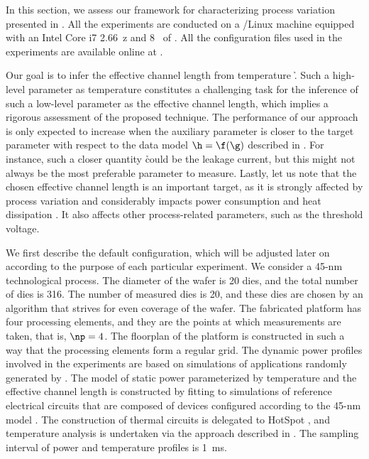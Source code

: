 In this section, we assess our framework for characterizing process variation
presented in . All the experiments are conducted on a
/Linux machine equipped with an Intel Core i7 2.66~z and
8~ of . All the configuration files used in the experiments are
available online at \cite{eslab2014a}.

Our goal is to infer the effective channel length \g from temperature \h. Such a
high-level parameter as temperature constitutes a challenging task for the
inference of such a low-level parameter as the effective channel length, which
implies a rigorous assessment of the proposed technique. The performance of our
approach is only expected to increase when the auxiliary parameter \h is closer
to the target parameter \g with respect to the data model $\h = \f(\g)$
described in . For instance, such a closer quantity \h
could be the leakage current, but this might not always be the most preferable
parameter to measure. Lastly, let us note that the chosen effective channel
length is an important target, as it is strongly affected by process variation
and considerably impacts power consumption and heat dissipation
\cite{chandrakasan2000, srivastava2010, juan2011, juan2012}. It also affects
other process-related parameters, such as the threshold voltage.

We first describe the default configuration, which will be adjusted later on
according to the purpose of each particular experiment. We consider a 45-nm
technological process. The diameter of the wafer is 20 dies, and the total
number of dies \nd is 316. The number of measured dies \hnd is 20, and these
dies are chosen by an algorithm that strives for even coverage of the wafer. The
fabricated platform has four processing elements, and they are the points at
which measurements are taken, that is, $\np = 4$. The floorplan of the platform
is constructed in such a way that the processing elements form a regular grid.
The dynamic power profiles involved in the experiments are based on simulations
of applications randomly generated by  \cite{dick1998}. The model of
static power parameterized by temperature and the effective channel length is
constructed by fitting to  simulations of reference electrical
circuits that are composed of  devices \cite{bsim} configured
according to the 45-nm   model \cite{ptm}. The construction of
thermal  circuits is delegated to HotSpot \cite{skadron2003}, and
temperature analysis is undertaken via the approach described in
. The sampling interval of power and temperature
profiles is 1~ms.


